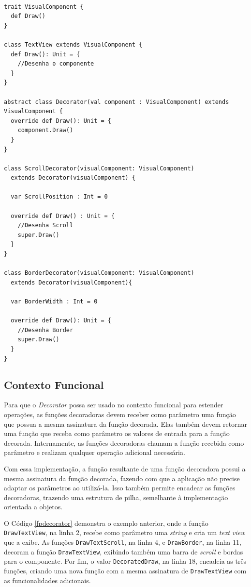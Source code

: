 \begin{lstlisting}[caption={\textit{Decorator} Orientado a Objetos.},label=oodecorator]

trait VisualComponent {
  def Draw()
}

class TextView extends VisualComponent {
  def Draw(): Unit = {
    //Desenha o componente
  }
}

abstract class Decorator(val component : VisualComponent) extends VisualComponent {
  override def Draw(): Unit = {
    component.Draw()
  }
}

class ScrollDecorator(visualComponent: VisualComponent)
  extends Decorator(visualComponent) {

  var ScrollPosition : Int = 0

  override def Draw() : Unit = {
    //Desenha Scroll
    super.Draw()
  }
}

class BorderDecorator(visualComponent: VisualComponent)
  extends Decorator(visualComponent){

  var BorderWidth : Int = 0

  override def Draw(): Unit = {
    //Desenha Border
    super.Draw()
  }
}

\end{lstlisting}

\subsection*{Contexto Funcional}

Para que o \textit{Decorator} possa ser usado no contexto 
funcional para estender operações, as funções 
decoradoras devem receber como parâmetro uma função 
que possua a mesma assinatura da função decorada. 
Elas também devem retornar uma função que receba 
como parâmetro os valores de entrada para a 
função decorada. Internamente, as funções decoradoras 
chamam a função recebida como parâmetro e realizam 
qualquer operação adicional necessária. 

Com essa implementação, a função resultante de uma 
função decoradora possui a mesma assinatura da função 
decorada, fazendo com que a aplicação não precise adaptar 
os parâmetros ao utilizá-la. Isso também permite 
encadear as funções decoradoras, trazendo uma estrutura de 
pilha, semelhante à implementação orientada a objetos.

O Código \ref{fpdecorator} demonstra o exemplo anterior, onde 
a função \texttt{DrawTextView}, na linha 2, recebe como parâmetro uma 
\textit{string} e cria um \textit{text view} que a exibe. As funções 
\texttt{DrawTextScroll}, na linha 4, e \texttt{DrawBorder}, na linha 11, decoram 
a função \texttt{DrawTextView}, exibindo também uma barra de \textit{scroll} 
e bordas para o componente. Por fim, o valor \texttt{DecoratedDraw}, na 
linha 18, encadeia as três funções, criando uma nova função 
com a mesma assinatura de \texttt{DrawTextView} com as funcionalidades 
adicionais.

